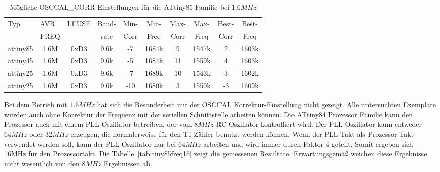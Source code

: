 \begin{table}[H]
  \begin{center}
    \begin{tabular}{| l | c | c | c || c | c || c | c || c | c |}
    \hline
   Typ  &       AVR\_ & LFUSE & Baud- & Min- & Min- & Max- & Max- & Best- & Best-  \\
        &       FREQ  &       & rate & Corr & Freq & Corr & Freq  & Corr  & Freq  \\
    \hline
    \hline
attiny85 &         1.6M & 0xD3  & 9.6k &  -7  & 1684k &  9  & 1547k  & 2  & 1603k \\
    \hline
attiny45  &        1.6M & 0xD3  & 9.6k &  -5  & 1684k & 11  & 1559k  & 4  & 1603k \\
    \hline
attiny25  &        1.6M & 0xD3  & 9.6k &  -7   & 1689k & 10 & 1543k  & 3  & 1602k \\
attiny25  &        1.6M & 0xD3  & 9.6k &  -10  & 1680k & 3  & 1550k  & -3  & 1609k \\
    \hline
    \end{tabular}
  \end{center}
  \caption{Mögliche OSCCAL\_CORR Einstellungen für die ATtiny85 Familie bei \(1.6MHz\)}
  \label{tab:tiny85freq1}
\end{table}

Bei dem Betrieb mit \(1.6MHz\) hat sich die Besonderheit mit der OSCCAL Korrektur-Einstellung
nicht gezeigt. Alle untersuchten Exemplare würden auch ohne Korrektur der Frequenz
mit der seriellen Schnittstelle arbeiten können.
Die ATtiny84 Prozessor Familie kann den Prozessor auch mit einem PLL-Oszillator betreiben,
der vom \(8MHz\) RC-Oszillator kontrolliert wird. Der PLL-Oszillator kann entweder \(64MHz\) oder
\(32MHz\) erzeugen, die normalerweise für den T1 Zähler benutzt werden können.
Wenn der PLL-Takt als Prozessor-Takt verwendet werden soll, kann der PLL-Oszillator nur
bei \(64MHz\) arbeiten und wird immer durch Faktor 4 geteilt. Somit ergeben sich 16MHz 
für den Prozessortakt. Die Tabelle~\ref{tab:tiny85freq16} zeigt die gemessenen
Resultate. Erwartungsgemäß weichen diese Ergebnisse nicht wesentlich von den \(8MHz\) Ergebnissen
ab.

